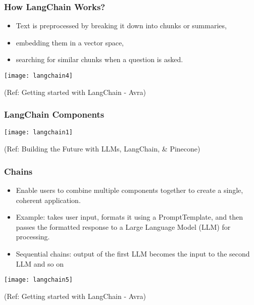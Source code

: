 \begin{frame}\frametitle{How LangChain Works?}

\begin{itemize}
\item Text is preprocessed by breaking it down into chunks or summaries, 
\item embedding them in a vector space, 
\item searching for similar chunks when a question is asked. 
\end{itemize}

\begin{center}
\texttt{[image: langchain4]}
\end{center}	  


{\tiny (Ref: Getting started with LangChain - Avra)}
\end{frame}


\begin{frame}\frametitle{LangChain Components}

\begin{center}
\texttt{[image: langchain1]}
\end{center}	  

{\tiny (Ref: Building the Future with LLMs, LangChain, \& Pinecone)}
\end{frame}

\begin{frame}\frametitle{Chains}

\begin{itemize}
\item Enable users to combine multiple components together to create a single, coherent application.
\item Example: takes user input, formats it using a PromptTemplate, and then passes the formatted response to a Large Language Model (LLM) for processing.
\item Sequential chains: output of the first LLM becomes the input to the second LLM and so on
\end{itemize}

\begin{center}
\texttt{[image: langchain5]}
\end{center}	  


{\tiny (Ref: Getting started with LangChain - Avra)}
\end{frame}

